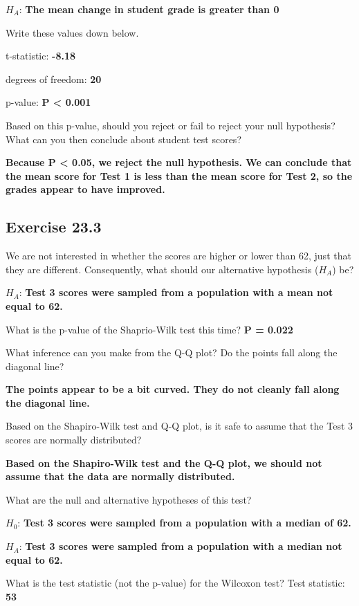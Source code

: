 \documentclass[
  openany]{krantz}
\begin{document}
\(H_{A}\): \textbf{The mean change in student grade is greater than 0}

Write these values down below.

t-statistic: \textbf{-8.18}

degrees of freedom: \textbf{20}

p-value: \textbf{P \textless{} 0.001}

Based on this p-value, should you reject or fail to reject your null hypothesis? What can you then conclude about student test scores?

\textbf{Because P \textless{} 0.05, we reject the null hypothesis. We can conclude that the mean score for Test 1 is less than the mean score for Test 2, so the grades appear to have improved.}

\hypertarget{exercise-23.3}{%
\subsection{Exercise 23.3}\label{exercise-23.3}}

We are not interested in whether the scores are higher or lower than 62, just that
they are different. Consequently, what should our alternative hypothesis (\(H_{A}\)) be?

\(H_{A}\): \textbf{Test 3 scores were sampled from a population with a mean not equal to 62.}

What is the p-value of the Shaprio-Wilk test this time? \textbf{P = 0.022}

What inference can you make from the Q-Q plot? Do the points fall along the diagonal line?

\textbf{The points appear to be a bit curved. They do not cleanly fall along the diagonal line.}

Based on the Shapiro-Wilk test and Q-Q plot, is it safe to assume that the Test 3 scores are normally distributed?

\textbf{Based on the Shapiro-Wilk test and the Q-Q plot, we should not assume that the data are normally distributed.}

What are the null and alternative hypotheses of this test?

\(H_{0}\): \textbf{Test 3 scores were sampled from a population with a median of 62.}

\(H_{A}\): \textbf{Test 3 scores were sampled from a population with a median not equal to 62.}

What is the test statistic (not the p-value) for the Wilcoxon test? Test statistic: \textbf{53}
\end{document}
